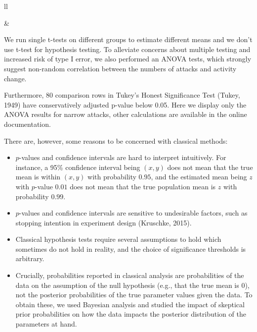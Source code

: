 \documentclass[10pt,dvipsnames]{scrartcl}
\begin{document}
\begin{tabular}{ll}
\begin{minipage}[c]{0.61\linewidth}

 \begin{table}[H]
\caption{ANOVA for activity change vs. narrow \\ attacks received.}
\label{tab:anovanarrow}
\end{table}
\end{minipage} & \begin{minipage}[c]{0.32\linewidth}
We run single t-tests on different groups to estimate different means and we don't use t-test for hypothesis testing. To alleviate concerns about multiple testing and increased risk of type I error,  we also  performed an  ANOVA tests, which strongly suggest non-random correlation between the numbers of attacks and activity change. 
\end{minipage} \end{tabular}

Furthermore, 80 comparison rows in Tukey's Honest Significance Test
(Tukey, 1949) have conservatively adjusted p-value below 0.05. Here we
display only the ANOVA results for narrow attacks, other calculations
are available in the online documentation.

There are, however, some reasons to be concerned with classical methods:

\begin{itemize}
\item
  \(p\)-values and confidence intervals are hard to interpret
  intuitively. For instance, a 95\% confidence interval being \((x,y)\)
  does not mean that the true mean is within \((x,y)\) with probability
  \(0.95\), and the estimated mean being \(z\) with \(p\)-value \(0.01\)
  does not mean that the true population mean is \(z\) with probability
  \(0.99\).
\item
  \(p\)-values and confidence intervals are sensitive to undesirable
  factors, such as stopping intention in experiment design (Kruschke,
  2015).
\item
  Classical hypothesis tests require several assumptions to hold which
  sometimes do not hold in reality, and the choice of significance
  thresholds is arbitrary.
\item
  Crucially, probabilities reported in classical analysis are
  probabilities of the data on the assumption of the null hypothesis
  (e.g., that the true mean is 0), not the posterior probabilities of
  the true parameter values given the data. To obtain these, we used
  Bayesian analysis and studied the impact of skeptical prior
  probabilities on how the data impacts the posterior distribution of
  the parameters at hand.
\end{itemize}
\end{document}
